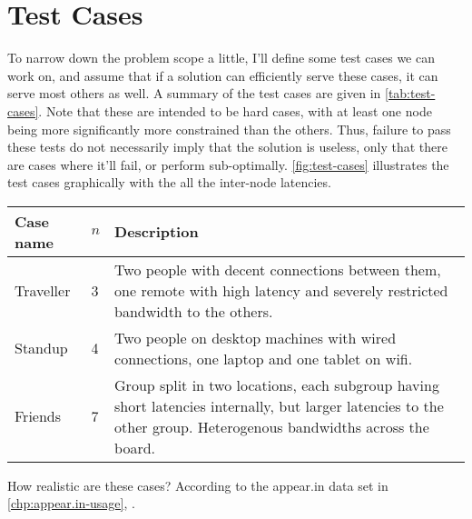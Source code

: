 \chapter{Test Cases}\label{chp:test-cases}

To narrow down the problem scope a little, I'll define some test cases we can work on, and assume that if a solution can efficiently serve these cases, it can serve most others as well. A summary of the test cases are given in \autoref{tab:test-cases}. Note that these are intended to be hard cases, with at least one node being more significantly more constrained than the others. Thus, failure to pass these tests do not necessarily imply that the solution is useless, only that there are cases where it'll fail, or perform sub-optimally. \autoref{fig:test-cases} illustrates the test cases graphically with the all the inter-node latencies.

\begin{center}
    \label{tab:test-cases}
    \begin{tabular}{| l | l | p{7cm} |}
    \hline
    \textbf{Case name} & \textbf{$n$} & \textbf{Description} \\ \hline
    Traveller & 3 & Two people with decent connections between them, one remote with high latency and severely restricted bandwidth to the others. \\ \hline
    Standup & 4 & Two people on desktop machines with wired connections, one laptop and one tablet on wifi. \\ \hline
    Friends & 7 & Group split in two locations, each subgroup having short latencies internally, but larger latencies to the other group. Heterogenous bandwidths across the board. \\ \hline
    \end{tabular}
\end{center}

How realistic are these cases? According to the appear.in data set in \autoref{chp:appear.in-usage}, .

